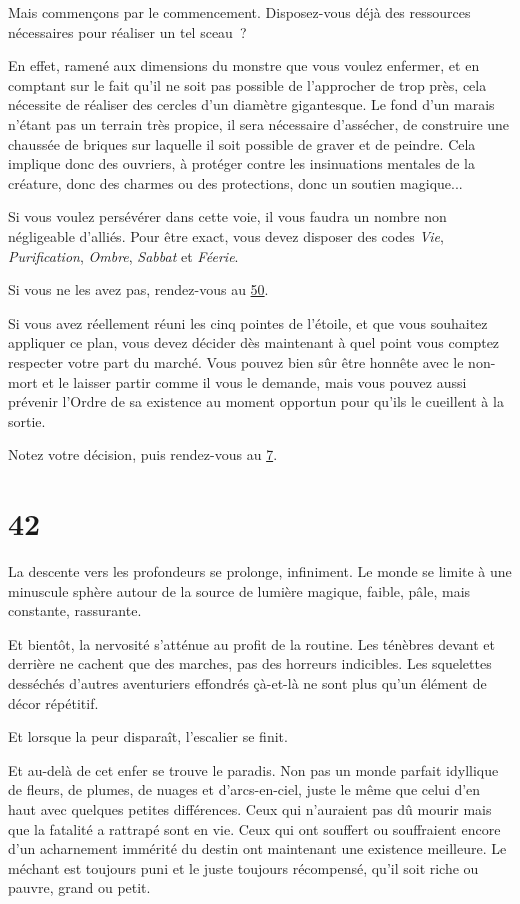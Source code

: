 \documentclass{report}
\newcommand{\gsection}[1]{
    \section{#1}
    \label{section-#1}
}
\newcommand{\glink}[1]{\hyperref[section-#1]{#1}}
\begin{document}
Mais commençons par le commencement. Disposez-vous déjà des ressources nécessaires pour réaliser un tel sceau ?

En effet, ramené aux dimensions du monstre que vous voulez enfermer, et en comptant sur le fait qu'il ne soit pas possible de l'approcher de trop près, cela nécessite de réaliser des cercles d'un diamètre gigantesque. Le fond d'un marais n'étant pas un terrain très propice, il sera nécessaire d'assécher, de construire une chaussée de briques sur laquelle il soit possible de graver et de peindre. Cela implique donc des ouvriers, à protéger contre les insinuations mentales de la créature, donc des charmes ou des protections, donc un soutien magique...

Si vous voulez persévérer dans cette voie, il vous faudra un nombre non négligeable d'alliés. Pour être exact, vous devez disposer des codes \emph{Vie}, \emph{Purification}, \emph{Ombre}, \emph{Sabbat} et \emph{Féerie}.

Si vous ne les avez pas, rendez-vous au \glink{50}.

Si vous avez réellement réuni les cinq pointes de l'étoile, et que vous souhaitez appliquer ce plan, vous devez décider dès maintenant à quel point vous comptez respecter votre part du marché. Vous pouvez bien sûr être honnête avec le non-mort et le laisser partir comme il vous le demande, mais vous pouvez aussi prévenir l'Ordre de sa existence au moment opportun pour qu'ils le cueillent à la sortie.

Notez votre décision, puis rendez-vous au \glink{7}.

\gsection{42}

La descente vers les profondeurs se prolonge, infiniment. Le monde se limite à une minuscule sphère autour de la source de lumière magique, faible, pâle, mais constante, rassurante.

Et bientôt, la nervosité s'atténue au profit de la routine. Les ténèbres devant et derrière ne cachent que des marches, pas des horreurs indicibles. Les squelettes desséchés d'autres aventuriers effondrés çà-et-là ne sont plus qu'un élément de décor répétitif.

Et lorsque la peur disparaît, l'escalier se finit.

Et au-delà de cet enfer se trouve le paradis. Non pas un monde parfait idyllique de fleurs, de plumes, de nuages et d'arcs-en-ciel, juste le même que celui d'en haut avec quelques petites différences. Ceux qui n'auraient pas dû mourir mais que la fatalité a rattrapé sont en vie. Ceux qui ont souffert ou souffraient encore d'un acharnement immérité du destin ont maintenant une existence meilleure. Le méchant est toujours puni et le juste toujours récompensé, qu'il soit riche ou pauvre, grand ou petit.
\end{document}
